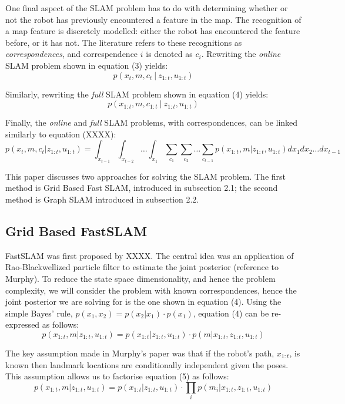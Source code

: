 \documentclass[a4paper]{article}
\begin{document}
One final aspect of the SLAM problem has to do with determining whether or not the robot has previously encountered a feature in the map. The recognition of a map feature is discretely modelled: either the robot has encountered the feature before, or it has not. The literature refers to these recognitions as \textit{correspondences}, and correspendence $i$ is denoted as $c_i$. Rewriting the \textit{online} SLAM problem shown in equation (3) yields:
\begin{equation}
p(x_t, m, c_t \ | \ z_{1:t}, u_{1:t})
\end{equation}

Similarly, rewriting the \textit{full} SLAM problem shown in equation (4) yields:
\begin{equation}
p(x_{1:t}, m, c_{1:t} \ | \ z_{1:t}, u_{1:t})
\end{equation}

Finally, the \textit{online} and \textit{full} SLAM problems, with correspondences, can be linked similarly to equation (XXXX):
\begin{equation}
p(x_t, m, c_t | z_{1:t}, u_{1:t}) = \int_{x_{t-1}} \int_{x_{t-2}} \dots \int_{x_1} \sum_{c_1} \sum_{c_2} \dots \sum_{c_{t-1}} p(x_{1:t}, m | z_{1:t}, u_{1:t}) dx_1 dx_2 \dots dx_{t-1}
\end{equation}

This paper discusses two approaches for solving the SLAM problem. The first method is Grid Based Fast SLAM, introduced in subsection 2.1; the second method is Graph SLAM introduced in subsection 2.2.

\subsection{Grid Based FastSLAM}
FastSLAM was first proposed by XXXX. The central idea was an application of Rao-Blackwellized particle filter to estimate the joint posterior (reference to Murphy). To reduce the state space dimensionality, and hence the problem complexity, we will consider the problem with known correspondences, hence the joint posterior we are solving for is the one shown in equation (4). Using the simple Bayes' rule, $p(x_1,x_2) = p(x_2|x_1) \cdot p(x_1)$, equation (4) can be re-expressed as follows:
\begin{equation}
p(x_{1:t}, m | z_{1:t}, u_{1:t}) = p(x_{1:t} | z_{1:t}, u_{1:t}) \cdot p(m | x_{1:t}, z_{1:t}, u_{1:t})
\end{equation}

The key assumption made in Murphy's paper was that if the robot's path, $x_{1:t}$, is known then landmark locations are conditionally independent given the poses. This assumption allows us to factorise equation (5) as follows:
\begin{equation}
p(x_{1:t}, m | z_{1:t}, u_{1:t}) = p(x_{1:t} | z_{1:t}, u_{1:t}) \cdot \prod_{i} p(m_i | x_{1:t}, z_{1:t}, u_{1:t})
\end{equation}
\end{document}

